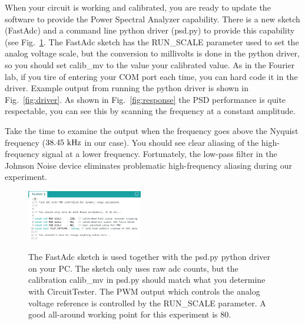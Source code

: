 \documentclass[12pt]{article}
\begin{document}
When your circuit is working and calibrated, you are ready to update the software to provide the Power Spectral Analyzer capability.  There is a new sketch (FastAdc) and a command line python driver (psd.py)
to provide this capability (see Fig.~\ref{fig:fastadc}.  The FastAdc sketch has the RUN\_SCALE parameter used to set the analog voltage scale, but the conversion to millivolts is done in the python driver, so you should set calib\_mv to the value your calibrated value.  As in the Fourier lab, if you tire of entering your COM port each time, you can hard code it in the driver.   Example output from running the python driver is shown in Fig.~\ref{fig:driver}.  As shown in Fig.~\ref{fig:response} the PSD performance is quite respectable, you can see this by scanning the frequency at a constant amplitude.  

Take the time to examine the output when the frequency goes above the Nyquist frequency ($38.45~\rm kHz$ in our case).  You should see clear aliasing of the high-frequency signal at a lower frequency.  Fortunately, the low-pass filter in the Johnson Noise device eliminates problematic high-frequency aliasing during our experiment.

\begin{figure}[htbp]
\begin{center}
{\includegraphics[width=0.45\textwidth]{figs/fast_adc.png}}
\end{center}
\caption{\label{fig:fastadc}    
The FastAdc sketch is used together with the psd.py python driver on your PC.  The sketch only uses raw adc counts, but the calibration calib\_mv in psd.py should match what you determine with CircuitTester.  
The PWM output which controls the analog voltage reference is controlled by the RUN\_SCALE parameter.
A good all-around working point for this experiment is 80.
}\end{figure}
\end{document}
